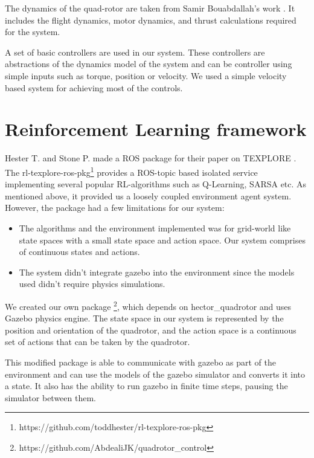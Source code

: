 \documentclass[hidelinks,BTech]{iitmdiss}
\begin{document}
The dynamics of the quad-rotor are taken from Samir Bouabdallah's work \cite{QuadrotorDynamics}. It includes the flight dynamics, motor dynamics, and thrust calculations required for the system. 

A set of basic controllers are used in our system. These controllers are abstractions of the dynamics model of the system and can be controller using simple inputs such as torque, position or velocity. We used a simple velocity based system for achieving most of the controls.

\section{Reinforcement Learning framework}
Hester T. and Stone P. made a ROS package for their paper on TEXPLORE \cite{Texplore}. The rl-texplore-ros-pkg\footnote{https://github.com/toddhester/rl-texplore-ros-pkg} provides a ROS-topic based isolated service implementing several popular RL-algorithms such as Q-Learning, SARSA etc. As mentioned above, it provided us a loosely coupled environment agent system. However, the package had a few limitations for our system:
\begin{itemize}
	\item The algorithms and the environment implemented was for grid-world like state spaces with a small state space and action space. Our system comprises of continuous states and actions.
	\item  The system didn't integrate gazebo into the environment since the models used didn't require physics simulations.
\end{itemize}

We created our own package \footnote{https://github.com/AbdealiJK/quadrotor\_control}, which depends on hector\_quadrotor and uses Gazebo physics engine. The state space in our system is represented by the position and orientation of the quadrotor, and the action space is a continuous set of actions that can be taken by the quadrotor.

This modified package is able to communicate with gazebo as part of the environment and can use the models of the gazebo simulator and converts it into a state. It also has the ability to run gazebo in finite time steps, pausing the simulator between them.
\end{document}

